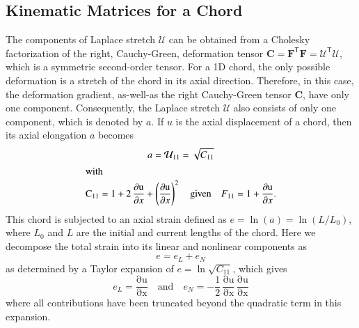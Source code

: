 \subsection{Kinematic Matrices for a Chord}

The components of Laplace stretch $\boldsymbol{\mathcal{U}}$ can be obtained from a Cholesky factorization of the right, Cauchy-Green, deformation tensor $\mathbf{C} = \mathbf{F}^{\mathsf{T}} \mathbf{F} = \boldsymbol{\mathcal{U}}^{\mathsf{T}} \boldsymbol{\mathcal{U}}$, \cite{Srinivasa12} which is a symmetric second-order tensor. For a 1D chord, the only possible deformation is a stretch of the chord in its axial direction. Therefore, in this case, the deformation gradient, as-well-as the right Cauchy-Green tensor $\mathbf{C}$, have only one component.  Consequently, the Laplace stretch $\boldsymbol{\mathcal{U}}$ also consists of only one component, which is denoted by $a$. If $u$ is the axial displacement of a chord, then its axial elongation $a$ becomes
\begin{subequations}
    \begin{gather}
    a = {\mathcal{U}}_{11} = \sqrt{C_{11}} \\
    \intertext{with} 
    \mathrm{C_{11}} = 1 + 2 \, \frac{\mathrm{\partial u}}{\partial x} + \left(\frac{\mathrm{\partial u}}{\partial x}\right)^2 
    \quad \text{given} \quad 
    F_{11} = 1 + \frac{\mathrm{\partial u}}{\partial x} .
    \end{gather}
\end{subequations} 
This chord is subjected to an axial strain defined as $e = \ln ( a ) = \ln ( L / L_0 )$, where $L_0$ and $L$ are the initial and current lengths of the chord.  Here we decompose the total strain into its linear and nonlinear components as
\begin{equation}
e = e_{L} + e_{N}
\end{equation} 
as determined by a Taylor expansion of $e = \ln \sqrt{C_{11}}$, which gives
\begin{equation}
    e_{L} = \mathrm{\frac{\partial u}{\partial x}} 
    \quad \text{and} \quad
    e_{N} = -\frac{1}{2} \, \mathrm{\frac{\partial u}{\partial x}}\, \mathrm{\frac{\partial u}{\partial x}} 
\end{equation}
where all contributions have been truncated beyond the quadratic term in this expansion.

